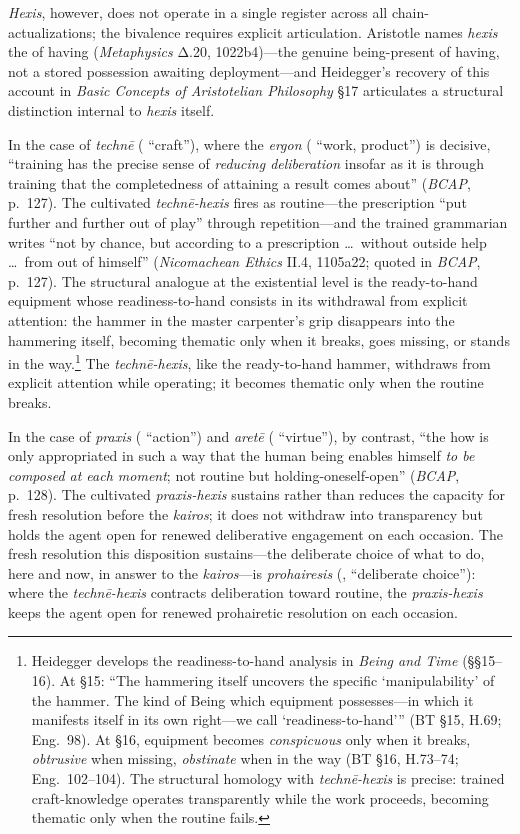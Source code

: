 \textit{Hexis}, however, does not operate in a single register across all chain-actualizations; the bivalence requires explicit articulation. Aristotle names \textit{hexis} the  of having (\textit{Metaphysics} Δ.20, 1022b4)---the genuine being-present of having, not a stored possession awaiting deployment---and Heidegger's recovery of this account in \textit{Basic Concepts of Aristotelian Philosophy} \S17 articulates a structural distinction internal to \textit{hexis} itself.

In the case of \textit{technē} ( ``craft''), where the \textit{ergon} ( ``work, product'') is decisive, ``training has the precise sense of \textit{reducing deliberation} insofar as it is through training that the completedness of attaining a result comes about'' (\textit{BCAP}, p.~127). The cultivated \textit{technē-hexis} fires as routine---the prescription ``put further and further out of play'' through repetition---and the trained grammarian writes ``not by chance, but according to a prescription \ldots\ without outside help \ldots\ from out of himself'' (\textit{Nicomachean Ethics} II.4, 1105a22; quoted in \textit{BCAP}, p.~127). The structural analogue at the existential level is the ready-to-hand equipment whose readiness-to-hand consists in its withdrawal from explicit attention: the hammer in the master carpenter's grip disappears into the hammering itself, becoming thematic only when it breaks, goes missing, or stands in the way.\footnote{Heidegger develops the readiness-to-hand analysis in \textit{Being and Time} (\S\S15--16). At \S15: ``The hammering itself uncovers the specific `manipulability' of the hammer. The kind of Being which equipment possesses---in which it manifests itself in its own right---we call `readiness-to-hand''' (BT \S15, H.69; Eng.~98). At \S16, equipment becomes \textit{conspicuous} only when it breaks, \textit{obtrusive} when missing, \textit{obstinate} when in the way (BT \S16, H.73--74; Eng.~102--104). The structural homology with \textit{technē-hexis} is precise: trained craft-knowledge operates transparently while the work proceeds, becoming thematic only when the routine fails.} The \textit{technē-hexis}, like the ready-to-hand hammer, withdraws from explicit attention while operating; it becomes thematic only when the routine breaks.

In the case of \textit{praxis} ( ``action'') and \textit{aretē} ( ``virtue''), by contrast, ``the how is only appropriated in such a way that the human being enables himself \textit{to be composed at each moment}; not routine but holding-oneself-open'' (\textit{BCAP}, p.~128). The cultivated \textit{praxis-hexis} sustains rather than reduces the capacity for fresh resolution before the \textit{kairos}; it does not withdraw into transparency but holds the agent open for renewed deliberative engagement on each occasion. The fresh resolution this disposition sustains---the deliberate choice of what to do, here and now, in answer to the \textit{kairos}---is \textit{prohairesis} (, ``deliberate choice''): where the \textit{technē-hexis} contracts deliberation toward routine, the \textit{praxis-hexis} keeps the agent open for renewed prohairetic resolution on each occasion.

